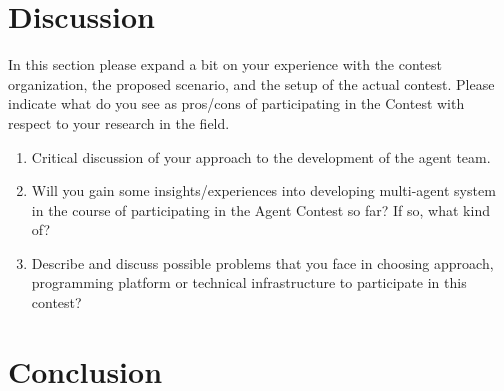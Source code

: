 \documentclass{llncs}
\begin{document}
\section{Discussion}
In this section please expand a bit on your experience with the
contest organization, the proposed scenario, and the setup of the
actual contest. Please indicate what do you see as pros/cons of
participating in the Contest with respect to your research in the
field.
\begin{enumerate}
    \item Critical discussion of your approach to the development of the
        agent team.
    \item Will you gain some insights/experiences into developing multi-agent system in
        the course of participating in the Agent Contest so far? If so,
        what kind of?
    \item Describe and discuss possible problems that you face in choosing approach, programming
        platform or technical infrastructure to participate in this contest?
\end{enumerate}


\section{Conclusion}
\end{document}
